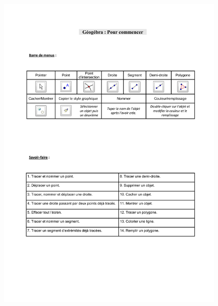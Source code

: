 \begin{figure}[H]
  \centering
  \includegraphics[width=\linewidth]{sources/pages/1.1.2/pour_commencer.pdf}
  \caption{\label{moulinette}}
\end{figure}


